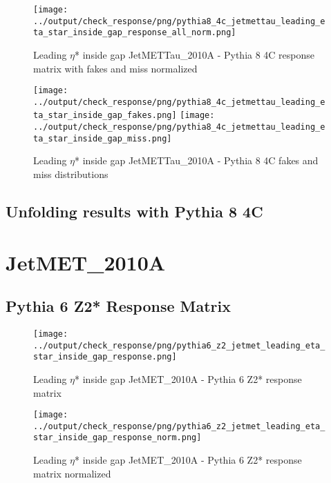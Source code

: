 \documentclass[11pt]{book}
\begin{document}
\begin{figure}[ht]
\centering
\texttt{[image: ../output/check\_response/png/pythia8\_4c\_jetmettau\_leading\_eta\_star\_inside\_gap\_response\_all\_norm.png]}
\caption{Leading $\eta$* inside gap JetMETTau\_2010A - Pythia 8 4C response matrix with fakes and miss normalized}
\label{p8_jetmettau_leading_eta_star_inside_gap_response_all_norm}
\end{figure}

\begin{figure}[ht]
\centering
\texttt{[image: ../output/check\_response/png/pythia8\_4c\_jetmettau\_leading\_eta\_star\_inside\_gap\_fakes.png]}
\texttt{[image: ../output/check\_response/png/pythia8\_4c\_jetmettau\_leading\_eta\_star\_inside\_gap\_miss.png]}
\caption{Leading $\eta$* inside gap JetMETTau\_2010A - Pythia 8 4C fakes and miss distributions}
\label{p8_jetmettau_leading_eta_star_inside_gap_fakesmiss}
\end{figure}


\clearpage
\subsection{Unfolding results with Pythia 8 4C}


\section{JetMET\_2010A}
\subsection{Pythia 6 Z2* Response Matrix}

\begin{figure}[ht]
\centering
\texttt{[image: ../output/check\_response/png/pythia6\_z2\_jetmet\_leading\_eta\_star\_inside\_gap\_response.png]}
\caption{Leading $\eta$* inside gap JetMET\_2010A - Pythia 6 Z2* response matrix}
\label{p6_jetmet_leading_eta_star_inside_gap_response}
\end{figure}

\begin{figure}[ht]
\centering
\texttt{[image: ../output/check\_response/png/pythia6\_z2\_jetmet\_leading\_eta\_star\_inside\_gap\_response\_norm.png]}
\caption{Leading $\eta$* inside gap JetMET\_2010A - Pythia 6 Z2* response matrix normalized}
\label{p6_jetmet_leading_eta_star_inside_gap_response_norm}
\end{figure}
\end{document}
